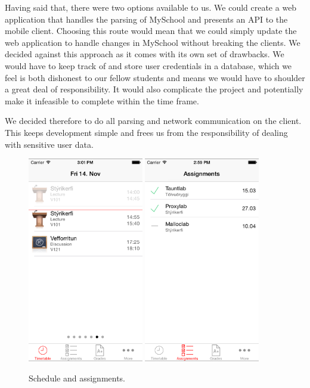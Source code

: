 \documentclass[pdftex, DIV=calc, paper=a4, fontsize=11pt]{scrartcl}	 %
\begin{document}
Having said that, there were two options available to us. We could create a web application that handles
the parsing of MySchool and presents an API to the mobile client. Choosing this route would mean that
we could simply update the web application to handle changes in MySchool without breaking the 
clients. We decided against this approach as it comes with its own set of drawbacks. We would have
to keep track of and store user credentials in a database, which we feel is both dishonest to our
fellow students and means we would have to shoulder a great deal of responsibility. It would also 
complicate the project and potentially make it infeasible to complete within the time frame.

We decided therefore to do all parsing and network communication on the client. This keeps development
simple and frees us from the responsibility of dealing with sensitive user data.

\begin{figure}[t]
    \centering
    \includegraphics[width=0.45\textwidth]{schedule.png}
    \hspace{0.2in}
    \includegraphics[width=0.45\textwidth]{assignments.png}
    \caption{Schedule and assignments.}
    \label{fig:grades}
\end{figure}
\end{document}
